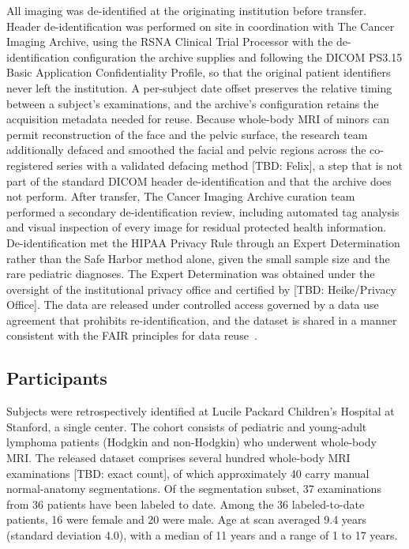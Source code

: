 All imaging was de-identified at the originating institution before transfer.
Header de-identification was performed on site in coordination with The Cancer Imaging Archive, using the RSNA Clinical Trial Processor with the de-identification configuration the archive supplies and following the DICOM PS3.15 Basic Application Confidentiality Profile, so that the original patient identifiers never left the institution.
A per-subject date offset preserves the relative timing between a subject's examinations, and the archive's configuration retains the acquisition metadata needed for reuse.
Because whole-body MRI of minors can permit reconstruction of the face and the pelvic surface, the research team additionally defaced and smoothed the facial and pelvic regions across the co-registered series with a validated defacing method [TBD: Felix], a step that is not part of the standard DICOM header de-identification and that the archive does not perform.
After transfer, The Cancer Imaging Archive curation team performed a secondary de-identification review, including automated tag analysis and visual inspection of every image for residual protected health information.
De-identification met the HIPAA Privacy Rule through an Expert Determination rather than the Safe Harbor method alone, given the small sample size and the rare pediatric diagnoses.
The Expert Determination was obtained under the oversight of the institutional privacy office and certified by [TBD: Heike/Privacy Office].
The data are released under controlled access governed by a data use agreement that prohibits re-identification, and the dataset is shared in a manner consistent with the FAIR principles for data reuse~\cite{Wilkinson_2016}.

\subsection*{Participants}\label{subsec:cohort}
Subjects were retrospectively identified at Lucile Packard Children's Hospital at Stanford, a single center.
The cohort consists of pediatric and young-adult lymphoma patients (Hodgkin and non-Hodgkin) who underwent whole-body MRI.
The released dataset comprises several hundred whole-body MRI examinations [TBD: exact count], of which approximately 40 carry manual normal-anatomy segmentations.
Of the segmentation subset, 37 examinations from 36 patients have been labeled to date.
Among the 36 labeled-to-date patients, 16 were female and 20 were male.
Age at scan averaged 9.4 years (standard deviation 4.0), with a median of 11 years and a range of 1 to 17 years.

